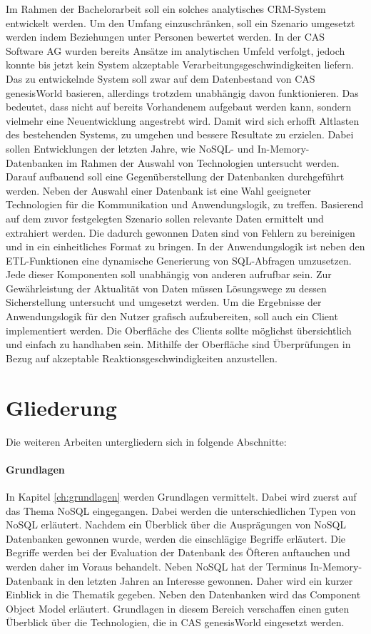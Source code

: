 Im Rahmen der Bachelorarbeit soll ein solches analytisches CRM-System entwickelt werden. Um den Umfang einzuschränken, soll ein Szenario umgesetzt werden indem Beziehungen unter Personen bewertet werden. In der CAS Software AG wurden bereits Ansätze im analytischen Umfeld verfolgt, jedoch konnte bis jetzt kein System akzeptable Verarbeitungsgeschwindigkeiten liefern. Das zu entwickelnde System soll zwar auf dem Datenbestand von CAS genesisWorld basieren, allerdings trotzdem unabhängig davon funktionieren. Das bedeutet, dass nicht auf bereits Vorhandenem aufgebaut werden kann, sondern vielmehr eine Neuentwicklung angestrebt wird. Damit wird sich erhofft Altlasten des bestehenden Systems, zu umgehen und bessere Resultate zu erzielen. Dabei sollen Entwicklungen der letzten Jahre, wie NoSQL- und In-Memory-Datenbanken im Rahmen der Auswahl von Technologien untersucht werden. Darauf aufbauend soll eine Gegenüberstellung der Datenbanken durchgeführt werden. Neben der Auswahl einer Datenbank ist eine Wahl geeigneter Technologien für die Kommunikation und Anwendungslogik, zu treffen. Basierend auf dem zuvor festgelegten Szenario sollen relevante Daten ermittelt und extrahiert werden. Die dadurch gewonnen Daten sind von Fehlern zu bereinigen und in ein einheitliches Format zu bringen.
In der Anwendungslogik ist neben den ETL-Funktionen eine dynamische Generierung von SQL-Abfragen umzusetzen. Jede dieser Komponenten soll unabhängig von anderen aufrufbar sein. Zur Gewährleistung der Aktualität von Daten müssen Lösungswege zu dessen Sicherstellung untersucht und umgesetzt werden. Um die Ergebnisse der Anwendungslogik für den Nutzer grafisch aufzubereiten, soll auch ein Client implementiert werden. Die Oberfläche des Clients sollte möglichst übersichtlich und einfach zu handhaben sein. Mithilfe der Oberfläche sind Überprüfungen in Bezug auf akzeptable Reaktionsgeschwindigkeiten anzustellen. 

\section{Gliederung}
\label{ch:Einfuehrung:sec:Gliederung}

Die weiteren Arbeiten untergliedern sich in folgende Abschnitte: 
 
\paragraph{Grundlagen} In Kapitel \ref{ch:grundlagen} werden Grundlagen vermittelt. Dabei wird zuerst auf das Thema NoSQL eingegangen. Dabei werden die unterschiedlichen Typen von NoSQL erläutert. Nachdem ein Überblick über die Ausprägungen von NoSQL Datenbanken gewonnen wurde, werden die einschlägige Begriffe erläutert. Die Begriffe werden bei der Evaluation der Datenbank des Öfteren auftauchen und werden daher im Voraus behandelt. Neben NoSQL hat der Terminus In-Memory-Datenbank in den letzten Jahren an Interesse gewonnen. Daher wird ein kurzer Einblick in die Thematik gegeben. Neben den Datenbanken wird das Component Object Model erläutert. Grundlagen in diesem Bereich verschaffen einen guten Überblick über die Technologien, die in CAS genesisWorld eingesetzt werden. 

